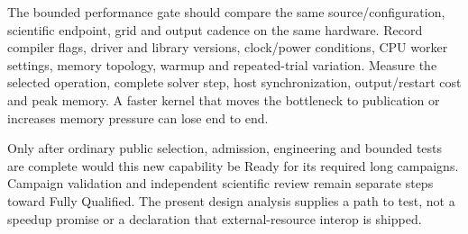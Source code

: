 The bounded performance gate should compare the same source/configuration,
scientific endpoint, grid and output cadence on the same hardware. Record
compiler flags, driver and library versions, clock/power conditions, CPU worker
settings, memory topology, warmup and repeated-trial variation. Measure the
selected operation, complete solver step, host synchronization, output/restart
cost and peak memory. A faster kernel that moves the bottleneck to publication
or increases memory pressure can lose end to end.

Only after ordinary public selection, admission, engineering and bounded tests
are complete would this new capability be Ready for its required long campaigns.
Campaign validation and independent scientific review remain separate steps
toward Fully Qualified. The present design analysis supplies a path to test,
not a speedup promise or a declaration that external-resource interop is shipped.
